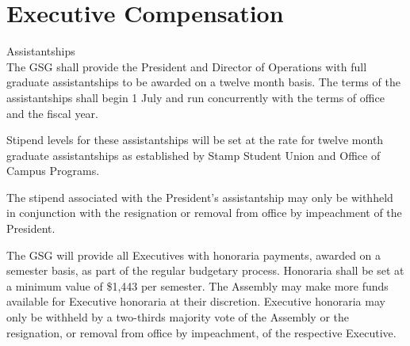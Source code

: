 \section{Executive Compensation}
\begin{bylaws-number}
  \item Assistantships \hfill \\
The GSG shall provide the President and Director of Operations with full graduate assistantships to be awarded on a twelve month basis. The terms of the assistantships shall begin 1 July and run concurrently with the terms of office and the fiscal year.
\begin{bylaws-number}
  \item Stipend levels for these assistantships will be set at the rate for twelve month graduate assistantships as established by Stamp Student Union and Office of Campus Programs.
  \item The stipend associated with the President’s assistantship may only be withheld in conjunction with the resignation or removal from office by impeachment of the President.
\end{bylaws-number}
  \item The GSG will provide all Executives with honoraria payments, awarded on a semester basis, as part of the regular budgetary process. Honoraria shall be set at a minimum value of \$1,443 per semester. The Assembly may make more funds available for Executive honoraria at their discretion. Executive honoraria may only be withheld by a two-thirds majority vote of the Assembly or the resignation, or removal from office by impeachment, of the respective Executive.
\end{bylaws-number}

